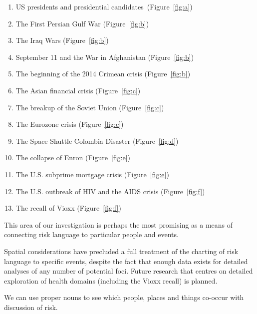     \begin{enumerate} \setlength\itemsep{0em}
    \item US presidents and presidential candidates~(Figure~\ref{fig:a})
    \item The First Persian Gulf War (Figure~\ref{fig:b})                   
    \item The Iraq Wars (Figure~\ref{fig:b})
    \item September 11 and the War in Afghanistan (Figure~\ref{fig:b})   
    \item The beginning of the 2014 Crimean crisis (Figure~\ref{fig:b})       
    \item The Asian financial crisis (Figure~\ref{fig:c})
    \item The breakup of the Soviet Union (Figure~\ref{fig:c})
    \item The Eurozone crisis (Figure~\ref{fig:c})
    \item The Space Shuttle Colombia Disaster (Figure~\ref{fig:d})
    \item The collapse of Enron (Figure~\ref{fig:e})
    \item The U.S. subprime mortgage crisis  (Figure~\ref{fig:e})
    \item The U.S. outbreak of HIV and the AIDS crisis (Figure~\ref{fig:f})
    \item The recall of Vioxx (Figure~\ref{fig:f})
    \end{enumerate}
    This area of our investigation is perhaps the most promising as a means of connecting risk language to particular people and events. 

    Spatial considerations have precluded a full treatment of the charting of risk language to specific events, despite the fact that enough data exists for detailed analyses of any number of potential foci. Future research that centres on detailed exploration of health domains (including the Vioxx recall) is planned.

    \vspace{5mm}\noindent\begin{tcolorbox}[colback=yellow!5,colframe=yellow!40!black,title=Summary: risk and proper nouns]
    \parbox{1\textwidth}{%
    We can use proper nouns to see which people, places and things co-occur with discussion of risk.}
    \end{tcolorbox}
    \vspace{5mm}

